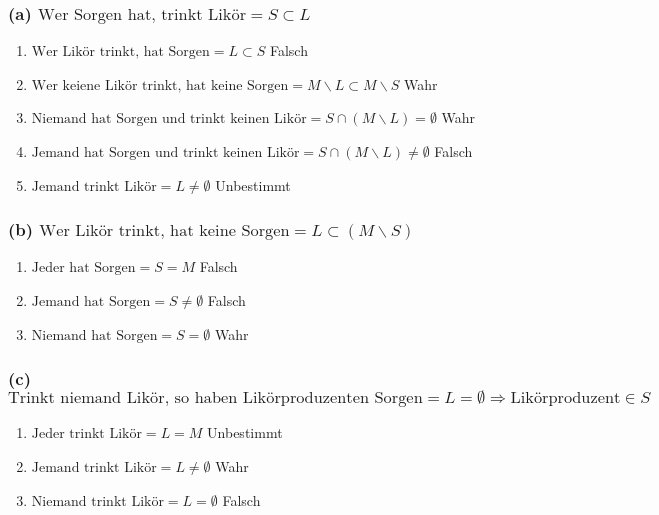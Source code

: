 \documentclass{article}
\begin{document}
        \subsubsection*{(a) \(\text{Wer Sorgen hat, trinkt Likör} = S \subset L \)}
            \begin{enumerate}[label=(\roman*)]
                \item \(\text{Wer Likör trinkt, hat Sorgen} = L \subset S\) Falsch
                \item \(\text{Wer keiene Likör trinkt, hat keine Sorgen} = M \backslash L \subset M \backslash S\) Wahr
                \item \(\text{Niemand hat Sorgen und trinkt keinen Likör} = S \cap (M \backslash L) = \emptyset\) Wahr
                \item \(\text{Jemand hat Sorgen und trinkt keinen Likör} = S \cap (M \backslash L) \not= \emptyset\) Falsch
                \item \(\text{Jemand trinkt Likör} = L \not= \emptyset\) Unbestimmt
            \end{enumerate}

        \subsubsection*{(b) \(\text{Wer Likör trinkt, hat keine Sorgen} = L \subset (M \backslash S)\)}
            \begin{enumerate}[label=(\roman*)]
                \item \(\text{Jeder hat Sorgen} = S = M\) Falsch
                \item \(\text{Jemand hat Sorgen} = S \neq \emptyset\) Falsch
                \item \(\text{Niemand hat Sorgen} = S = \emptyset\) Wahr
            \end{enumerate}

        \subsubsection*{(c) \(\text{Trinkt niemand Likör, so haben Likörproduzenten Sorgen} = L = \emptyset \Rightarrow \text{Likörproduzent} \in S\)}
            \begin{enumerate}[label=(\roman*)]
                \item \(\text{Jeder trinkt Likör} = L = M\) Unbestimmt
                \item \(\text{Jemand trinkt Likör} = L \neq \emptyset\) Wahr
                \item \(\text{Niemand trinkt Likör} = L = \emptyset\) Falsch
            \end{enumerate}
\end{document}
